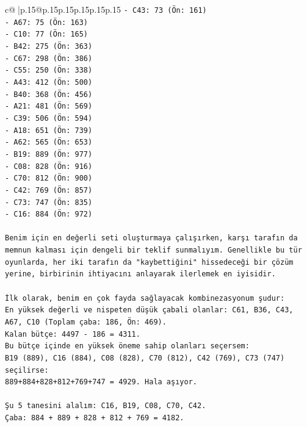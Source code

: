 \documentclass{article}
\begin{document}
{\begin{supertabular}{c@{$\;$}|p{.15\linewidth}@{}p{.15\linewidth}p{.15\linewidth}p{.15\linewidth}p{.15\linewidth}p{.15\linewidth}}
{{{\texttt{{-} C43: 73 (Ön: 161)} \\
\texttt{{-} A67: 75 (Ön: 163)} \\
\texttt{{-} C10: 77 (Ön: 165)} \\
\texttt{{-} B42: 275 (Ön: 363)} \\
\texttt{{-} C67: 298 (Ön: 386)} \\
\texttt{{-} C55: 250 (Ön: 338)} \\
\texttt{{-} A43: 412 (Ön: 500)} \\
\texttt{{-} B40: 368 (Ön: 456)} \\
\texttt{{-} A21: 481 (Ön: 569)} \\
\texttt{{-} C39: 506 (Ön: 594)} \\
\texttt{{-} A18: 651 (Ön: 739)} \\
\texttt{{-} A62: 565 (Ön: 653)} \\
\texttt{{-} B19: 889 (Ön: 977)} \\
\texttt{{-} C08: 828 (Ön: 916)} \\
\texttt{{-} C70: 812 (Ön: 900)} \\
\texttt{{-} C42: 769 (Ön: 857)} \\
\texttt{{-} C73: 747 (Ön: 835)} \\
\texttt{{-} C16: 884 (Ön: 972)} \\
\\ 
\texttt{Benim için en değerli seti oluşturmaya çalışırken, karşı tarafın da memnun kalması için dengeli bir teklif sunmalıyım. Genellikle bu tür oyunlarda, her iki tarafın da "kaybettiğini" hissedeceği bir çözüm yerine, birbirinin ihtiyacını anlayarak ilerlemek en iyisidir.} \\
\\ 
\texttt{İlk olarak, benim en çok fayda sağlayacak kombinezasyonum şudur:} \\
\texttt{En yüksek değerli ve nispeten düşük çabali olanlar: C61, B36, C43, A67, C10 (Toplam çaba: 186, Ön: 469).} \\
\texttt{Kalan bütçe: 4497 {-} 186 = 4311.} \\
\texttt{Bu bütçe içinde en yüksek öneme sahip olanları seçersem:} \\
\texttt{B19 (889), C16 (884), C08 (828), C70 (812), C42 (769), C73 (747) seçilirse:} \\
\texttt{889+884+828+812+769+747 = 4929. Hala aşıyor.} \\
\\ 
\texttt{Şu 5 tanesini alalım: C16, B19, C08, C70, C42.} \\
\texttt{Çaba: 884 + 889 + 828 + 812 + 769 = 4182.} \\
}}}
\end{supertabular}}
\end{document}
